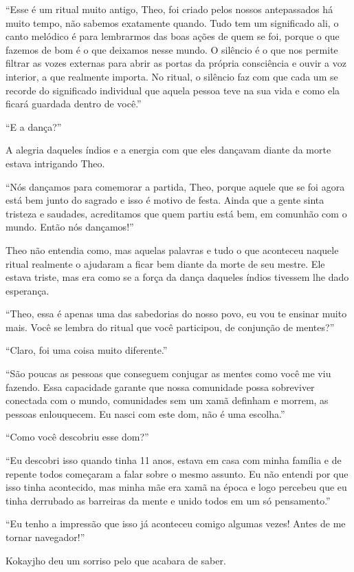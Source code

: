 ``Esse é um ritual muito antigo, Theo, foi criado pelos nossos
antepassados há muito tempo, não sabemos exatamente quando. Tudo tem um
significado ali, o canto melódico é para lembrarmos das boas ações de
quem se foi, porque o que fazemos de bom é o que deixamos nesse mundo. O
silêncio é o que nos permite filtrar as vozes externas para abrir as
portas da própria consciência e ouvir a voz interior, a que realmente
importa. No ritual, o silêncio faz com que cada um se recorde do
significado individual que aquela pessoa teve na sua vida e como ela
ficará guardada dentro de você.''

``E a dança?''

A alegria daqueles índios e a energia com que eles dançavam diante da
morte estava intrigando Theo.

``Nós dançamos para comemorar a partida, Theo, porque aquele que se foi
agora está bem junto do sagrado e isso é motivo de festa. Ainda que a
gente sinta tristeza e saudades, acreditamos que quem partiu está bem,
em comunhão com o mundo. Então nós dançamos!''

Theo não entendia como, mas aquelas palavras e tudo o que aconteceu
naquele ritual realmente o ajudaram a ficar bem diante da morte de seu
mestre. Ele estava triste, mas era como se a força da dança daqueles
índios tivessem lhe dado esperança.

``Theo, essa é apenas uma das sabedorias do nosso povo, eu vou te
ensinar muito mais. Você se lembra do ritual que você participou, de
conjunção de mentes?''

``Claro, foi uma coisa muito diferente.''

``São poucas as pessoas que conseguem conjugar as mentes como você me
viu fazendo. Essa capacidade garante que nossa comunidade possa
sobreviver conectada com o mundo, comunidades sem um xamã definham e
morrem, as pessoas enlouquecem. Eu nasci com este dom, não é uma
escolha.''

``Como você descobriu esse dom?''

``Eu descobri isso quando tinha 11 anos, estava em casa com minha
família e de repente todos começaram a falar sobre o mesmo assunto. Eu
não entendi por que isso tinha acontecido, mas minha mãe era xamã na
época e logo percebeu que eu tinha derrubado as barreiras da mente e
unido todos em um só pensamento.''

``Eu tenho a impressão que isso já aconteceu comigo algumas vezes! Antes
de me tornar navegador!''

Kokayjho deu um sorriso pelo que acabara de saber.

